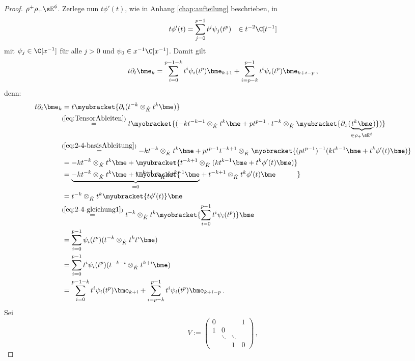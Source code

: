 \begin{proof}
$\rho^+\rho_+\sE^\phi$.
Zerlege nun $t\phi'(t)$, wie in Anhang \ref{chap:aufteilung} beschrieben, in
\begin{align} \label{eq:2-4-gleichung1}
t\phi'(t)&=\sum_{j=0}^{p-1}t^j\psi_j(t^p) &\in t^{-2}\C[t^{-1}]
\end{align}
mit $\psi_j\in\C[x^{-1}]$ für alle $j>0$ und $\psi_0\in x^{-1}\C[x^{-1}]$.
Damit gilt
\[
t\partial_t\bme_k= \sum_{i=0}^{p-1-k}t^i\psi_i(t^p)\bme_{k+1} +
  \sum_{i=p-k}^{p-1}t^i\psi_i(t^p)\bme_{k+i-p} \,,
\]
denn:
\begin{align*}
t\partial_t\bme_k &= 
  t\myubracket{\partial_t(t^{-k}\otimes_{\hat K}t^k\bme)}\\
  &\!\!\overset{(\ref{eq:TensorAbleiten})}{=} 
    t\myobracket{(-kt^{-k-1}\otimes_{\hat K}t^k\bme +
    pt^{p-1}\cdot t^{-k}\otimes_{\hat K}\myubracket{\partial_x
    (\underset{\in\rho_+\sE^\phi}{\underbrace{t^k\bme}})})}\\
  &\!\!\overset{(\ref{eq:2-4-basisAbleitung})}{=} -kt^{-k}\otimes_{\hat K}t^k\bme +
    pt^{p-1}t^{-k+1}\otimes_{\hat K}\myobracket{(pt^{p-1})^{-1} (kt^{k-1}\bme
    + t^k\phi'(t)\bme)}\\
  &= -kt^{-k}\otimes_{\hat K}t^k\bme +
    \myubracket{t^{-k+1}\otimes_{\hat K}(kt^{k-1}\bme + t^k\phi'(t)\bme)}\\
  &= \underset{=0}{\underbrace{-kt^{-k}\otimes_{\hat K}t^k\bme +
    \rlap{$\myobracket{\phantom{x^x\qquad\qquad\qquad\qquad\qquad\qquad\qquad%
      \,\,\,\,\,\,\,\,}}$}
    t^{-k+1}\otimes_{\hat K}kt^{k-1}\bme}} +
    t^{-k+1}\otimes_{\hat K}t^k\phi'(t)\bme\\
  &= t^{-k}\otimes_{\hat K}t^{k}\myubracket{t\phi'(t)}\bme\\
  &\!\!\overset{(\ref{eq:2-4-gleichung1})}{=}t^{-k}\otimes_{\hat K}
    t^{k} \myobracket{\sum_{i=0}^{p-1}t^i\psi_i(t^p)} \bme\\
  &=\sum_{i=0}^{p-1}\psi_i(t^p)(t^{-k}\otimes_{\hat K} t^{k} t^i \bme)\\
  &=\sum_{i=0}^{p-1}t^i\psi_i(t^p)(t^{-k-i}\otimes_{\hat K} t^{k+i} \bme)\\
  &= \sum_{i=0}^{p-1-k}t^i\psi_i(t^p)\bme_{k+i} +
  \sum_{i=p-k}^{p-1}t^i\psi_i(t^p)\bme_{k+i-p} \,.
\end{align*}
Sei
\[
V:=\begin{pmatrix}
0 &        &          & 1\\
1 & 0\\
  & \ddots & \ddots\\
  &        & 1        & 0
\end{pmatrix} \,,
\]
\end{proof}
